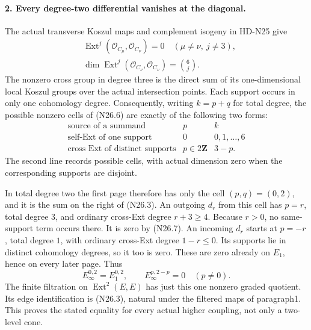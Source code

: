 \paragraph{2. Every degree-two differential vanishes at the diagonal.}
The actual transverse Koszul maps and complement isogeny
in HD-N25 give
\[
 \begin{split}
 &\operatorname{Ext}^j(\mathcal O_{C_\mu},\mathcal O_{C_\nu})=0
                 \quad(\mu\ne\nu,\ j\ne3),\\
 &\dim\operatorname{Ext}^j(\mathcal O_{C_\nu},\mathcal O_{C_\nu})
                                         =\binom6j.
 \end{split}                                                  \tag{N26.7}
\]
The nonzero cross group in degree three is the direct sum
of its one-dimensional local Koszul groups over the actual
intersection points. Each support occurs in only one
cohomology degree. Consequently, writing $k=p+q$ for total
degree, the possible nonzero cells of (N26.6) are exactly
of the following two forms:
\[
 \begin{array}{c|c|c}
 \text{source of a summand}&p&k\\ \hline
 \text{self-Ext of one support}&0&0,1,\ldots,6\\
 \text{cross Ext of distinct supports}&p\in2\mathbf Z&3-p.
 \end{array}                                                  \tag{N26.8}
\]
The second line records possible cells, with actual dimension
zero when the corresponding supports are disjoint.

In total degree two the first page therefore has only the
cell $(p,q)=(0,2)$, and it is the sum on the right of
(N26.3). An outgoing $d_r$ from this cell has
$p=r$, total degree $3$, and ordinary cross-Ext degree
$r+3\ge4$. Because $r>0$, no same-support term occurs
there. It is zero by (N26.7). An incoming $d_r$ starts at
$p=-r$, total degree $1$, with ordinary cross-Ext degree
$1-r\le0$. Its supports lie in distinct cohomology
degrees, so it too is zero. These are zero already on
$E_1$, hence on every later page. Thus
\[
                   E_\infty^{0,2}=E_1^{0,2},\qquad
                   E_\infty^{p,2-p}=0\quad(p\ne0).       \tag{N26.9}
\]
The finite filtration on $\operatorname{Ext}^2(E,E)$ has
just this one nonzero graded quotient. Its edge
identification is (N26.3), natural under the filtered maps
of paragraph1. This proves the stated equality for every
actual higher coupling, not only a two-level cone.

